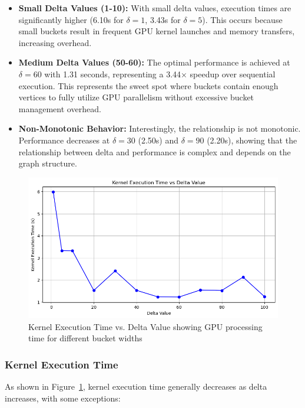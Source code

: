 \documentclass{article}
\begin{document}
\begin{itemize}
    \item \textbf{Small Delta Values (1-10):} With small delta values, execution times are significantly higher (6.10s for $\delta=1$, 3.43s for $\delta=5$). This occurs because small buckets result in frequent GPU kernel launches and memory transfers, increasing overhead.
    
    \item \textbf{Medium Delta Values (50-60):} The optimal performance is achieved at $\delta=60$ with 1.31 seconds, representing a 3.44× speedup over sequential execution. This represents the sweet spot where buckets contain enough vertices to fully utilize GPU parallelism without excessive bucket management overhead.
    
    \item \textbf{Non-Monotonic Behavior:} Interestingly, the relationship is not monotonic. Performance decreases at $\delta=30$ (2.50s) and $\delta=90$ (2.20s), showing that the relationship between delta and performance is complex and depends on the graph structure.
\end{itemize}

\begin{figure}[ht]
    \centering
    \includegraphics[width=\linewidth]{KernelTime.png}
    \caption{Kernel Execution Time vs. Delta Value showing GPU processing time for different bucket widths}
    \label{fig:kernel_time}
\end{figure}

\subsubsection*{Kernel Execution Time}

As shown in Figure~\ref{fig:kernel_time}, kernel execution time generally decreases as delta increases, with some exceptions:
\end{document}
